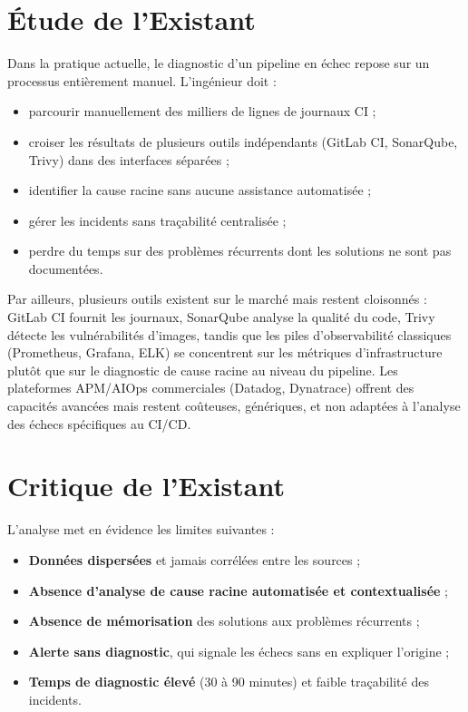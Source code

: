 \documentclass[12pt,a4paper,oneside]{report}
\begin{document}
\section{Étude de l'Existant}
Dans la pratique actuelle, le diagnostic d'un pipeline en échec repose sur un processus entièrement manuel. L'ingénieur doit :
\begin{itemize}[leftmargin=1.4em]
  \item parcourir manuellement des milliers de lignes de journaux CI ;
  \item croiser les résultats de plusieurs outils indépendants (GitLab CI, SonarQube, Trivy) dans des interfaces séparées ;
  \item identifier la cause racine sans aucune assistance automatisée ;
  \item gérer les incidents sans traçabilité centralisée ;
  \item perdre du temps sur des problèmes récurrents dont les solutions ne sont pas documentées.
\end{itemize}
Par ailleurs, plusieurs outils existent sur le marché mais restent cloisonnés : GitLab CI fournit les journaux, SonarQube analyse la qualité du code, Trivy détecte les vulnérabilités d'images, tandis que les piles d'observabilité classiques (Prometheus, Grafana, ELK) se concentrent sur les métriques d'infrastructure plutôt que sur le diagnostic de cause racine au niveau du pipeline. Les plateformes APM/AIOps commerciales (Datadog, Dynatrace) offrent des capacités avancées mais restent coûteuses, génériques, et non adaptées à l'analyse des échecs spécifiques au CI/CD.

\section{Critique de l'Existant}
L'analyse met en évidence les limites suivantes :
\begin{itemize}[leftmargin=1.4em]
  \item \textbf{Données dispersées} et jamais corrélées entre les sources ;
  \item \textbf{Absence d'analyse de cause racine automatisée et contextualisée} ;
  \item \textbf{Absence de mémorisation} des solutions aux problèmes récurrents ;
  \item \textbf{Alerte sans diagnostic}, qui signale les échecs sans en expliquer l'origine ;
  \item \textbf{Temps de diagnostic élevé} (30 à 90 minutes) et faible traçabilité des incidents.
\end{itemize}
\end{document}
